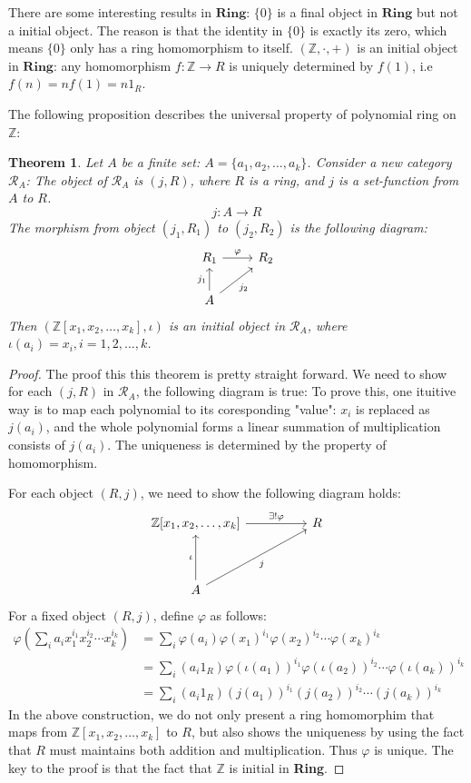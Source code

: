 \documentclass[a4paper, pdf, 11.5pt]{article}
\newtheorem{theorem}{Theorem}
\begin{document}
There are some interesting results in $\textbf{Ring}$: 
 $\{0\}$ is a final object in $\textbf{Ring}$ but not a initial object. The reason is that the identity in $\{0\}$ is exactly its zero, which means $\{0\}$ only has a ring homomorphism to itself.
 $(\mathbb{Z}, \cdot, +)$ is an initial object in $\textbf{Ring}$: any homomorphism $f: \mathbb{Z} \rightarrow R$ is uniquely determined by $f(1)$, i.e $f(n) = nf(1)=n1_{R}$.

The following proposition describes the universal property of polynomial ring on $\mathbb{Z}$: 


\begin{theorem}
Let $A$ be a finite set: $A=\{a_1, a_2,\ldots, a_{k}\}$. Consider a new category $\mathscr{R}_{A}$: The object of $\mathscr{R}_{A}$ is $(j, R)$, where $R$ is a ring, and $j$ is 
a set-function from $A$ to $R$.
$$
j:A\rightarrow R
$$ 
The morphism from object $(j_{1}, R_{1})$ to $(j_{2}, R_{2})$ is the following diagram:
$$
\begin{tikzcd}
  R_1 \arrow[r, "\varphi"]              & R_2 \\
  A \arrow[u, "j_1"] \arrow[ru, "j_2"'] &    
\end{tikzcd}
$$
Then $(\mathbb{Z}[x_1,x_2,\ldots,x_{k}], \iota)$ is an initial object in $\mathscr{R}_{A}$, where $\iota(a_{i}) = x_{i}, i=1,2,\ldots, k$.
\end{theorem}
\vspace{0.2cm}
\begin{proof}
The proof this this theorem is pretty straight forward. We need to show for each $(j, R)$ in $\mathscr{R}_{A}$, the following diagram is true:
To prove this, one ituitive way is to map each polynomial to its coresponding "value": $x_{i}$ is replaced as $j(a_{i})$, and the whole polynomial forms a linear summation of multiplication consists of $j(a_{i})$. The uniqueness is determined by the property of homomorphism.

For each object $(R, j)$, we need to show the following diagram holds:
$$
\begin{tikzcd}[row sep=huge]
  {\mathbb{Z}[x_1,x_2,\ldots,x_k]} \arrow[rr, "\exists!\varphi"] &  & R \\
  A \arrow[rru, "j"'] \arrow[u, "\iota"]                         &  &  
  \end{tikzcd}
$$
For a fixed object $(R, j)$, define $\varphi$ as follows:
$$
\begin{aligned}
\varphi(\sum_{i}a_{i}x_1^{i_1}x_2^{i_2}\cdots x_{k}^{i_k}) &= \sum_{i}\varphi(a_{i})\varphi(x_1)^{i_1}\varphi(x_2)^{i_2}\cdots\varphi(x_k)^{i_k}\\
&= \sum_{i} (a_i1_{R})\varphi(\iota(a_1))^{i_1}\varphi(\iota(a_2))^{i_2}\cdots\varphi(\iota(a_k))^{i_k}\\
&= \sum_{i} (a_i1_{R})(j(a_1))^{i_1}(j(a_2))^{i_2}\cdots(j(a_k))^{i_k}
\end{aligned}
$$
In the above construction, we do not only present a ring homomorphim that maps from 
$\mathbb{Z}[x_1,x_2,\ldots, x_k]$ to $R$, but also shows the uniqueness by using the fact 
that $R$ must maintains both addition and multiplication. Thus $\varphi$ is unique. The key to 
the proof is that the fact that $\mathbb{Z}$ is initial in \textbf{Ring}.
\end{proof}
\end{document}
